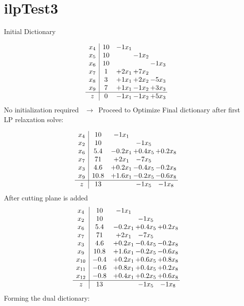 \documentclass[11pt]{article}
\begin{document}
\section{ilpTest3}

Initial Dictionary 

\[\begin{array}{c| c c@{\hskip 2pt} c@{\hskip 2pt} c@{\hskip 2pt} }
 x_{4}   &  10 & -1 x_{1} &    &   \\
 x_{5}   &  10  &   & -1 x_{2} &   \\
 x_{6}   &  10  &    &   & -1 x_{3}\\
 x_{7}   &  1 & + 2 x_{1} & + 7 x_{2} &   \\
 x_{8}   &  3 & + 1 x_{1} & + 2 x_{2} & -5 x_{3}\\
 x_{9}   &  7 & + 1 x_{1} & -1 x_{2} & + 3 x_{3}\\
\hline
z    &  0 & -1 x_{1} & -1 x_{2} & + 5 x_{3}\\
\end{array}\]
No initialization required \ $\rightarrow$\  Proceed to Optimize 
Final dictionary after first LP relaxation solve: 

\[\begin{array}{c| c c@{\hskip 2pt} c@{\hskip 2pt} c@{\hskip 2pt} }
 x_{4}   &  10 & -1 x_{1} &    &   \\
 x_{2}   &  10  &   & -1 x_{5} &   \\
 x_{6}   &  5.4 & -0.2 x_{1} & + 0.4 x_{5} & + 0.2 x_{8}\\
 x_{7}   &  71 & + 2 x_{1} & -7 x_{5} &   \\
 x_{3}   &  4.6 & + 0.2 x_{1} & -0.4 x_{5} & -0.2 x_{8}\\
 x_{9}   &  10.8 & + 1.6 x_{1} & -0.2 x_{5} & -0.6 x_{8}\\
\hline
z    &  13  &   & -1 x_{5} & -1 x_{8}\\
\end{array}\]
 After cutting plane is added 
\[\begin{array}{c| c c@{\hskip 2pt} c@{\hskip 2pt} c@{\hskip 2pt} }
 x_{4}   &  10 & -1 x_{1} &    &   \\
 x_{2}   &  10  &   & -1 x_{5} &   \\
 x_{6}   &  5.4 & -0.2 x_{1} & + 0.4 x_{5} & + 0.2 x_{8}\\
 x_{7}   &  71 & + 2 x_{1} & -7 x_{5} &   \\
 x_{3}   &  4.6 & + 0.2 x_{1} & -0.4 x_{5} & -0.2 x_{8}\\
 x_{9}   &  10.8 & + 1.6 x_{1} & -0.2 x_{5} & -0.6 x_{8}\\
 x_{10}   &  -0.4 & + 0.2 x_{1} & + 0.6 x_{5} & + 0.8 x_{8}\\
 x_{11}   &  -0.6 & + 0.8 x_{1} & + 0.4 x_{5} & + 0.2 x_{8}\\
 x_{12}   &  -0.8 & + 0.4 x_{1} & + 0.2 x_{5} & + 0.6 x_{8}\\
\hline
z    &  13  &   & -1 x_{5} & -1 x_{8}\\
\end{array}\]
Forming the dual dictionary:
\end{document}
